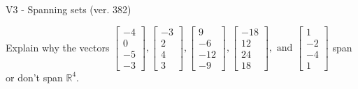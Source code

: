 \begin{exercise}
  \begin{exerciseTitle}V3 - Spanning sets (ver. 382)\end{exerciseTitle}
  \begin{exerciseStatement}
    Explain why the vectors \(\left[\begin{array}{r}
-4 \\
0 \\
-5 \\
-3
\end{array}\right] , \left[\begin{array}{r}
-3 \\
2 \\
4 \\
3
\end{array}\right] , \left[\begin{array}{r}
9 \\
-6 \\
-12 \\
-9
\end{array}\right] , \left[\begin{array}{r}
-18 \\
12 \\
24 \\
18
\end{array}\right] , \text{ and } \left[\begin{array}{r}
1 \\
-2 \\
-4 \\
1
\end{array}\right]\) span or don't span \(\mathbb{R}^4\). 
	



\end{exerciseStatement}
\end{exercise}
